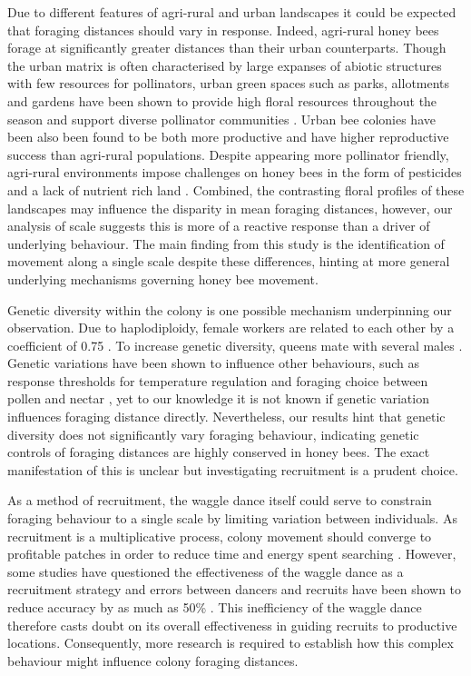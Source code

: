 \documentclass[11pt,usenames,dvipsnames,a4paper]{article}
\begin{document}
\begin{linenumbers}
Due to different features of agri-rural and urban landscapes it could be expected that foraging distances should vary in response. Indeed, agri-rural honey bees forage at significantly greater distances than their urban counterparts. Though the urban matrix is often characterised by large expanses of abiotic structures with few resources for pollinators, urban green spaces such as parks, allotments and gardens have been shown to provide high floral resources throughout the season \citep{Baldock2015, Plascencia2017, Baldock2019} and support diverse pollinator communities \citep{Hall2017}. Urban bee colonies have been also been found to be both more productive \citep{Lecocq2015} and have higher reproductive success \citep{Samuelson2018} than agri-rural populations. Despite appearing more pollinator friendly, agri-rural environments impose challenges on honey bees in the form of pesticides \citep{Wood2017} and a lack of nutrient rich land \citep{Carvell2006}. Combined, the contrasting floral profiles of these landscapes may influence the disparity in mean foraging distances, however, our analysis of scale suggests this is more of a reactive response than a driver of underlying behaviour. The main finding from this study is the identification of movement along a single scale despite these differences, hinting at more general underlying mechanisms governing honey bee movement.

Genetic diversity within the colony is one possible mechanism underpinning our observation. Due to haplodiploidy, female workers are related to each other by a coefficient of 0.75 \citep{Ratnieks1989}. To increase genetic diversity, queens mate with several males \citep{Jones2004}. Genetic variations have been shown to influence other behaviours, such as response thresholds for temperature regulation \citep{Jones2004} and foraging choice between pollen and nectar \citep{Fewell1993, Fewell2000}, yet to our knowledge it is not known if genetic variation influences foraging distance directly. Nevertheless, our results hint that genetic diversity does not significantly vary foraging behaviour, indicating genetic controls of foraging distances are highly conserved in honey bees. The exact manifestation of this is unclear but investigating recruitment is a prudent choice.

As a method of recruitment, the waggle dance itself could serve to constrain foraging behaviour to a single scale by limiting variation between individuals. As recruitment is a multiplicative process, colony movement should converge to profitable patches in order to reduce time and energy spent searching \citep{Seeley1995}. However, some studies have questioned the effectiveness of the waggle dance as a recruitment strategy \citep{Sherman2002, Dornhaus2004, Gruter2008, Gruter2009, Schurch2013} and errors between dancers and recruits have been shown to reduce accuracy by as much as 50\% \citep{Schurch2013}. This inefficiency of the waggle dance therefore casts doubt on its overall effectiveness in guiding recruits to productive locations. Consequently, more research is required to establish how this complex behaviour might influence colony foraging distances.


\end{linenumbers}
\end{document}
